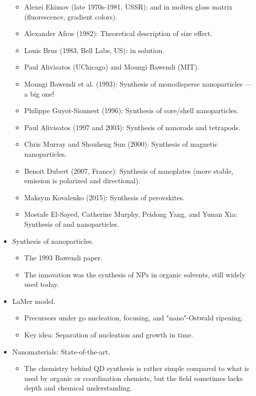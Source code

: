 \documentclass[../notes.tex]{subfiles}
\begin{document}
\begin{itemize}
\begin{itemize}
        \item Alexei Ekimov (late 1970s-1981, USSR):  and  in molten glass matrix (fluorescence, gradient colors).
        \item Alexander Afros (1982): Theoretical description of size effect.
        \item Louis Brus (1983, Bell Labs, US):  in solution.
        \item Paul Alivisatos (UChicago) and Moungi Bawendi (MIT).
        \item Moungi Bawendi et al. (1993): Synthesis of monodisperse  nanoparticles --- a big one!
        \item Philippe Guyot-Sionnest (1996): Synthesis of core/shell nanoparticles.
        \item Paul Alivisatos (1997 and 2003): Synthesis of nanorods and tetrapods.
        \item Chris Murray and Shouheng Sun (2000): Synthesis of magnetic  nanoparticles.
        \item Benoit Dubert (2007, France): Synthesis of  nanoplates (more stable, emission is polarized and directional).
        \item Maksym Kovalenko (2015): Synthesis of perovskites.
        \item Mostafe El-Sayed, Catherine Murphy, Peidong Yang, and Yunan Xia: Synthesis of  and  nanoparticles.
    \end{itemize}
    \item Synthesis of nanoparticles.
    \begin{itemize}
        \item The 1993 Bawendi paper.
        \item The innovation was the synthesis of NPs in organic solvents, still widely used today.
    \end{itemize}
    \item LaMer model.
    \begin{itemize}
        \item Precursors under go nucleation, focusing, and "nano"-Ostwald ripening.
        \item Key idea: Separation of nucleation and growth in time.
    \end{itemize}
    \item Nanomaterials: State-of-the-art.
    \begin{itemize}
        \item The chemistry behind QD synthesis is rather simple compared to what is used by organic or coordination chemists, but the field sometimes lacks depth and chemical understanding.

\end{itemize}
\end{itemize}
\end{document}

